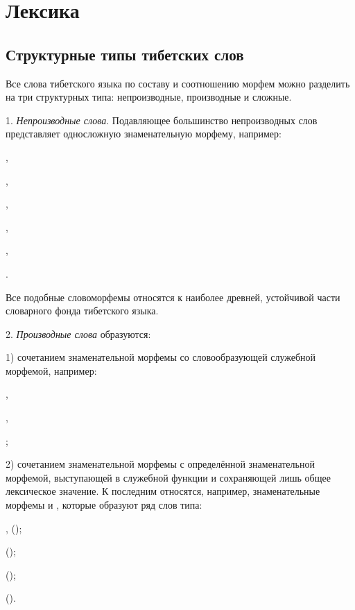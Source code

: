 \chapter{Лексика}

\section{Структурные типы тибетских слов}

Все слова тибетского языка по составу и соотношению морфем можно разделить на три структурных типа: непроизводные, производные и сложные.

1. \emph{Непроизводные слова}. Подавляющее большинство непроизводных слов представляет односложную знаменательную морфему, например:
\begin{prfsample}
	\item {},
	\item {},
	\item {},
	\item {},
	\item {},
	\item {}.	
\end{prfsample}
Все подобные словоморфемы относятся к наиболее древней, устойчивой части словарного фонда тибетского языка.

2. \emph{Производные слова} образуются:

1) сочетанием знаменательной морфемы со словообразующей служебной морфемой, например:
\begin{prfsample}
	\item {},
	\item {},
	\item {};
\end{prfsample}

2) сочетанием знаменательной морфемы с определённой знаменательной морфемой, выступающей в служебной функции и сохраняющей лишь общее лексическое значение. К последним относятся, например, знаменательные морфемы  и , которые образуют ряд слов типа:
\begin{prfsample}
	\item {}, ();
	\item {} ();
	\item {} ();
	\item {} ().
\end{prfsample}

